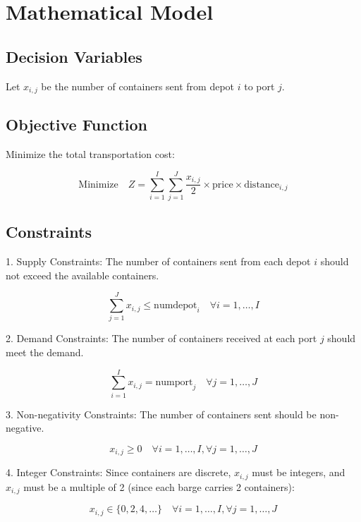 \documentclass{article}
\begin{document}
\section*{Mathematical Model}

\subsection*{Decision Variables}

Let \( x_{i,j} \) be the number of containers sent from depot \( i \) to port \( j \).

\subsection*{Objective Function}

Minimize the total transportation cost:

\[
\text{Minimize} \quad Z = \sum_{i=1}^I \sum_{j=1}^J \frac{x_{i,j}}{2} \times \text{price} \times \text{distance}_{i,j}
\]

\subsection*{Constraints}

1. Supply Constraints: The number of containers sent from each depot \( i \) should not exceed the available containers.

\[
\sum_{j=1}^J x_{i,j} \leq \text{numdepot}_i \quad \forall i = 1, \ldots, I
\]

2. Demand Constraints: The number of containers received at each port \( j \) should meet the demand.

\[
\sum_{i=1}^I x_{i,j} = \text{numport}_j \quad \forall j = 1, \ldots, J
\]

3. Non-negativity Constraints: The number of containers sent should be non-negative.

\[
x_{i,j} \geq 0 \quad \forall i = 1, \ldots, I, \forall j = 1, \ldots, J
\]

4. Integer Constraints: Since containers are discrete, \( x_{i,j} \) must be integers, and \( x_{i,j} \) must be a multiple of 2 (since each barge carries 2 containers):

\[
x_{i,j} \in \{0, 2, 4, \ldots\} \quad \forall i = 1, \ldots, I, \forall j = 1, \ldots, J
\]
\end{document}
